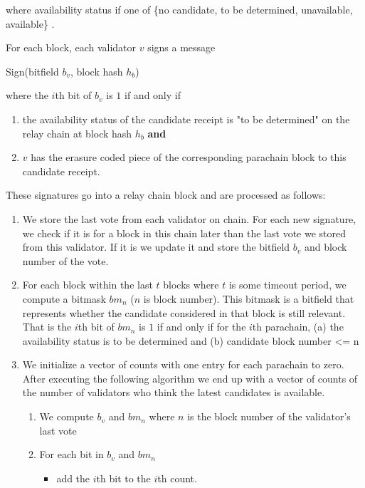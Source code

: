 {where availability status if one of \{no candidate, to be determined, unavailable, available\} .

For each block, each validator $v$ signs a message

Sign(bitfield $b_v$, block hash $h_b$)

where the $i$th bit of $b_v$ is $1$ if and only if 

\begin{enumerate}
\item the availability status of the candidate receipt is "to be determined" on the relay chain at block hash $h_b$ \textbf{and}

\item $v$ has the erasure coded piece of the corresponding parachain block to this candidate receipt.
\end{enumerate}

These signatures go into a relay chain block and are processed as follows:

\begin{enumerate}
\item We store the last vote from each validator on chain. For each new signature, we check if it is for a block in this chain later than the last vote we stored from this validator. If it is we update it and store the bitfield $b_v$ and block number of the vote.

\item For each block within the last $t$ blocks where $t$ is some timeout period, we compute a bitmask $bm_n$ ($n$ is block number). This bitmask is a bitfield that represents whether the candidate considered in that block is still relevant. That is the $i$th bit of $bm_n$ is $1$ if and only if for the $i$th parachain, 
    (a) the availability status is to be determined and
    (b) candidate block number <= n  
    
\item We initialize a vector of counts with one entry for each parachain to zero. After executing the following algorithm we end up with a vector of counts  of the number of validators who think the latest candidates is available. 
	\begin{enumerate}
    \item We compute 
    $b_v$ and $bm_n$ 
    where $n$ is the block number of the validator's last vote
   \item For each bit in $b_v$ and $bm_n$
		\begin{itemize}
        \item add the $i$th bit to the $i$th count.
        \end{itemize}
	\end{enumerate}
		

\end{enumerate}}

